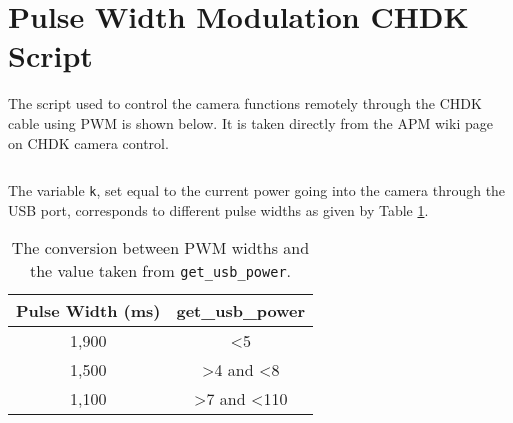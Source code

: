 \section{Pulse Width Modulation CHDK Script}
\label{app:pwm}

The script used to control the camera functions remotely through the CHDK cable
using PWM is shown below. It is taken directly from the APM wiki page on CHDK
camera
control.

\inputminted{vb.net}{code/3DR_Shoot.bas}

The variable \texttt{k}, set equal to the current power going into the camera
through the USB port, corresponds to different pulse widths as given by Table
\ref{tab:pwm}.

\begin{table}[H]
    \begin{center}
        \begin{tabular}{| c | c |}
            \hline
            \textbf{Pulse Width (ms)} & \textbf{get\_usb\_power} \\
            \hline
            1,900 & \textless 5 \\
            1,500 & \textgreater 4 and \textless 8 \\
            1,100 & \textgreater 7 and \textless 110 \\
            \hline
        \end{tabular}
        \caption{The conversion between PWM widths and the value taken from
        \texttt{get\_usb\_power}.}
        \label{tab:pwm}
    \end{center}
\end{table}
